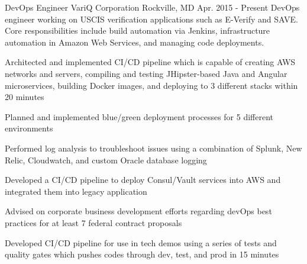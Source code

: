

\begin{cventries}

  \cventrysix
    {DevOps Engineer} %
    {VariQ Corporation} %
    {Rockville, MD} %
    {Apr. 2015 - Present} %
    {DevOps engineer working on USCIS verification applications such as E-Verify and SAVE. Core responsibilities include build automation via Jenkins, infrastructure automation in Amazon Web Services, and managing code deployments.} %
    {
      \begin{cvitems} %
        \item {Architected and implemented CI/CD pipeline which is capable of creating AWS networks and servers, compiling and testing JHipster-based Java and Angular microservices, building Docker images, and deploying to 3 different stacks within 20 minutes}
        \item {Planned and implemented blue/green deployment processes for 5 different environments}
        \item {Performed log analysis to troubleshoot issues using a combination of Splunk, New Relic, Cloudwatch, and custom Oracle database logging}
        \item {Developed a CI/CD pipeline to deploy Consul/Vault services into AWS and integrated them into legacy application}
        \item {Advised on corporate business development efforts regarding devOps best practices for at least 7 federal contract proposals}
        \item {Developed CI/CD pipeline for use in tech demos using a series of tests and quality gates which pushes codes through dev, test, and prod in 15 minutes}

\end{cvitems}}
\end{cventries}
